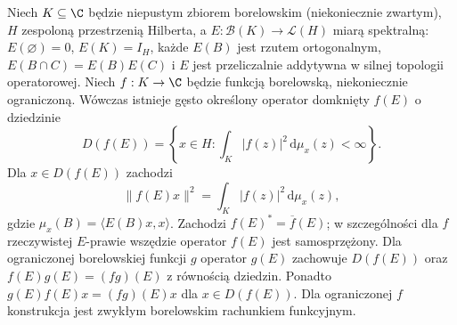 \begin{lemat}
\label{lem:unbounded-integral33}
Niech $K\subseteq\C$ będzie niepustym zbiorem borelowskim
(niekoniecznie zwartym), $H$ zespoloną przestrzenią Hilberta,
a $E:\mathcal B(K)\to\mathcal L(H)$ miarą spektralną:
$E(\varnothing)=0$, $E(K)=I_H$, każde $E(B)$ jest rzutem ortogonalnym,
$E(B\cap C)=E(B)E(C)$ i $E$ jest przeliczalnie addytywna
w silnej topologii operatorowej. Niech $f:K\to\C$ będzie
funkcją borelowską, niekoniecznie ograniczoną.
Wówczas istnieje gęsto określony operator domknięty $f(E)$
o dziedzinie
\[
 D(f(E))=\left\{x\in H:\int_K|f(z)|^2\,\mathrm d\mu_x(z)<\infty\right\}.
\]
Dla $x\in D(f(E))$ zachodzi
\[
 \|f(E)x\|^2=\int_K|f(z)|^2\,\mathrm d\mu_x(z),
\]
gdzie $\mu_x(B)=\langle E(B)x,x\rangle$.
Zachodzi $f(E)^*=\overline f(E)$; w szczególności dla
$f$ rzeczywistej $E$-prawie wszędzie operator $f(E)$ jest
samosprzężony. Dla ograniczonej borelowskiej funkcji $g$
operator $g(E)$ zachowuje $D(f(E))$ oraz
$f(E)g(E)=(fg)(E)$ z równością dziedzin. Ponadto
$g(E)f(E)x=(fg)(E)x$ dla $x\in D(f(E))$.
Dla ograniczonej $f$ konstrukcja jest zwykłym borelowskim
rachunkiem funkcyjnym.
\end{lemat}
